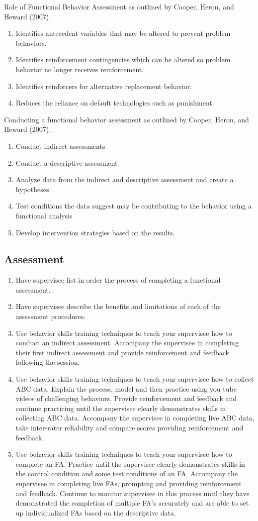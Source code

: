Role of Functional Behavior Assessment as outlined by Cooper, Heron, and Heward (2007).
\begin{enumerate}
\item Identifies antecedent variables that may be altered to prevent problem behaviors.
\item Identifies reinforcement contingencies which can be altered so problem behavior no longer receives reinforcement.
\item Identifies reinforcers for alternative replacement behavior.
\item Reduces the reliance on default technologies such as punishment.
\end{enumerate}

Conducting a functional behavior assessment as outlined by Cooper, Heron, and Heward (2007).
\begin{enumerate}
\item Conduct indirect assessments
\item Conduct a descriptive assessment
\item Analyze data  from the indirect and descriptive assessment and create a hypotheses 
\item Test conditions the data suggest may be contributing to the behavior using a functional analysis
\item Develop intervention strategies based on the results.
\end{enumerate}
%
\subsection{Assessment}
\begin{enumerate}
\item Have supervisee list in order the process of completing a functional assessment.
\item Have supervisee describe the benefits and limitations of each of the assessment procedures.
\item Use behavior skills training techniques to teach your supervisee how to conduct an indirect assessment.  Accompany the supervisee in completing their first indirect assessment and provide reinforcement and feedback following the session.
\item Use behavior skills training techniques to teach your supervisee how to collect ABC data.  Explain the process, model and then practice using you tube videos of challenging behaviors.  Provide reinforcement and feedback and continue practicing until the supervisee clearly demonstrates skills in collecting ABC data.  Accompany the supervisee in completing live ABC data, take inter-rater reliability and compare scores providing reinforcement and feedback.
\item Use behavior skills training techniques to teach your supervisee how to complete an FA. Practice until the supervisee clearly demonstrates skills in the control condition and some test conditions of an FA.  Accompany the supervisee in completing live FAs, prompting and providing reinforcement and feedback.  Continue to monitor supervisee in this process until they have demonstrated the completion of multiple FA's accurately and are able to set up individualized FAs based on the descriptive data.
\end{enumerate}
%

